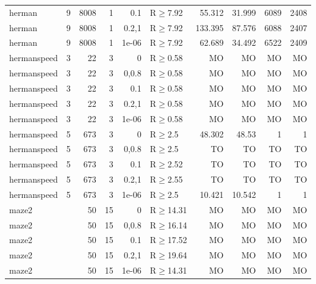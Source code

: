 \begin{longtable}{llrrrlrrrr}
 herman        & 9        &   	8008 &   1 & 0.1   & R$\geq$7.92  & 55.312   & 31.999   & 6089    & 2408    \\
 herman        & 9        &   	8008 &   1 & 0.2,1 & R$\geq$7.92  & 133.395  & 87.576   & 6088    & 2407    \\
 herman        & 9        &   	8008 &   1 & 1e-06 & R$\geq$7.92  & 62.689   & 34.492   & 6522    & 2409    \\
 hermanspeed   & 3        &     	22 &   3 & 0     & R$\geq$0.58  & MO       & MO       & MO      & MO      \\
 hermanspeed   & 3        &     	22 &   3 & 0,0.8 & R$\geq$0.58  & MO       & MO       & MO      & MO      \\
 hermanspeed   & 3        &     	22 &   3 & 0.1   & R$\geq$0.58  & MO       & MO       & MO      & MO      \\
 hermanspeed   & 3        &     	22 &   3 & 0.2,1 & R$\geq$0.58  & MO       & MO       & MO      & MO      \\
 hermanspeed   & 3        &     	22 &   3 & 1e-06 & R$\geq$0.58  & MO       & MO       & MO      & MO      \\
 hermanspeed   & 5        &    	673 &   3 & 0     & R$\geq$2.5   & 48.302   & 48.53    & 1       & 1       \\
 hermanspeed   & 5        &    	673 &   3 & 0,0.8 & R$\geq$2.5   & TO       & TO       & TO      & TO      \\
 hermanspeed   & 5        &    	673 &   3 & 0.1   & R$\geq$2.52  & TO       & TO       & TO      & TO      \\
 hermanspeed   & 5        &    	673 &   3 & 0.2,1 & R$\geq$2.55  & TO       & TO       & TO      & TO      \\
 hermanspeed   & 5        &    	673 &   3 & 1e-06 & R$\geq$2.5   & 10.421   & 10.542   & 1       & 1       \\
 maze2         &          &     	50 &  15 & 0     & R$\geq$14.31 & MO       & MO       & MO      & MO      \\
 maze2         &          &     	50 &  15 & 0,0.8 & R$\geq$16.14 & MO       & MO       & MO      & MO      \\
 maze2         &          &     	50 &  15 & 0.1   & R$\geq$17.52 & MO       & MO       & MO      & MO      \\
 maze2         &          &     	50 &  15 & 0.2,1 & R$\geq$19.64 & MO       & MO       & MO      & MO      \\
 maze2         &          &     	50 &  15 & 1e-06 & R$\geq$14.31 & MO       & MO       & MO      & MO      \\

\end{longtable}
